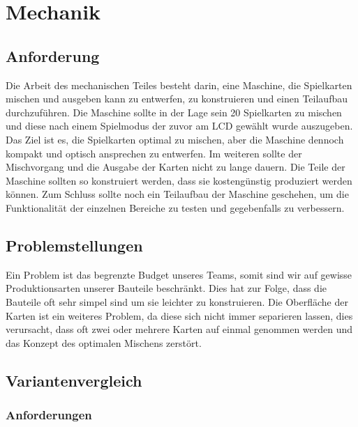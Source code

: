 \chapter{Mechanik}

\section{Anforderung}
\label{sec:Anforderung}
Die Arbeit des mechanischen Teiles besteht darin, eine Maschine,
die Spielkarten mischen und ausgeben kann zu entwerfen, zu konstruieren
und einen Teilaufbau durchzuführen. Die Maschine sollte in der Lage
sein 20 Spielkarten zu mischen und diese nach einem Spielmodus der
zuvor am LCD gewählt wurde auszugeben. Das Ziel ist es, die Spielkarten
optimal zu mischen, aber die Maschine dennoch kompakt und optisch
ansprechen zu entwerfen. Im weiteren sollte der Mischvorgang und die
Ausgabe der Karten nicht zu lange dauern. Die Teile der Maschine
sollten so konstruiert werden, dass sie kostengünstig produziert
werden können. Zum Schluss sollte noch ein Teilaufbau der Maschine
geschehen, um die Funktionalität der einzelnen Bereiche zu testen
und gegebenfalls zu verbessern.

\section{Problemstellungen}
Ein Problem ist das begrenzte Budget unseres Teams, somit sind
wir auf gewisse Produktionsarten unserer Bauteile beschränkt.
Dies hat zur Folge, dass die Bauteile oft sehr simpel sind um
sie leichter zu konstruieren. Die Oberfläche der Karten ist ein
weiteres Problem, da diese sich nicht immer separieren lassen, dies
verursacht, dass oft zwei oder mehrere Karten auf einmal genommen
werden und das Konzept des optimalen Mischens zerstört.

\section{Variantenvergleich}

\subsection{Anforderungen}

